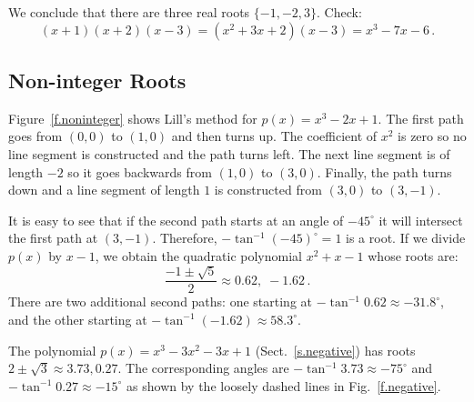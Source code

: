 \newpage

We conclude that there are three real roots $\{-1,-2,3\}$.
Check:
\[
(x+1)(x+2)(x-3)=(x^2+3x+2)(x-3) =x^3-7x-6\,.
\]


\subsection{Non-integer Roots}\label{s.noninteger}
Figure~\ref{f.noninteger} shows Lill's method for $p(x)=x^3-2x+1$. The first path goes from $(0,0)$ to $(1,0)$ and then turns up. The coefficient of $x^2$ is zero so no line segment is constructed and the path turns left. The next line segment is of length $-2$ so it goes backwards from $(1,0)$ to $(3,0)$. Finally, the path turns down and a line segment of length $1$ is constructed from $(3,0)$ to $(3,-1)$.

It is easy to see that if the second path starts at an angle of $-45^\circ$ it will intersect the first path at $(3,-1)$. Therefore, $-\tan^{-1} (-45)^\circ=1$ is a root. If we divide $p(x)$ by $x-1$, we obtain the quadratic polynomial $x^2+x-1$ whose roots are:
\[
\frac{-1\pm\sqrt{5}}{2} \approx 0.62,\; -1.62\,.
\]
There are two additional second paths: one starting at $-\tan^{-1} 0.62\approx -31.8^\circ$, and the other starting at $-\tan^{-1}(-1.62)\approx 58.3^\circ$.

The polynomial $p(x)=x^3-3x^2-3x+1$ (Sect.~\ref{s.negative}) has roots $ 2\pm\sqrt{3}\approx 3.73, 0.27$. The corresponding angles are $-\tan^{-1} 3.73 \approx -75^\circ$ and $-\tan^{-1} 0.27 \approx -15^\circ$ as shown by the loosely dashed lines in Fig.~\ref{f.negative}.


